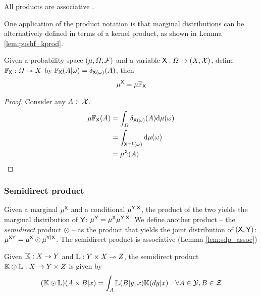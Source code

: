 All products are associative \citep[Chapter 1]{cinlar_probability_2011}.

One application of the product notation is that marginal distributions can be alternatively defined in terms of a kernel product, as shown in Lemma \ref{lem:pushf_kprod}.

\begin{lemma}\label{lem:pushf_kprod}
Given a probability space $(\mu,\Omega,\mathcal{F})$ and a variable $\mathsf{X}:\Omega\to (X,\mathcal{X})$, define $\mathbb{F}_{\mathsf{X}}:\Omega\rightarrowtriangle X$ by $\mathbb{F}_{\mathsf{X}}(A|\omega)=\delta_{\mathsf{X}(\omega)}(A)$, then
\begin{align}
	\mu^{\mathsf{X}} = \mu\mathbb{F}_{\mathsf{X}}
\end{align}
\end{lemma}

\begin{proof}
Consider any $A\in \mathcal{X}$.
\begin{align}
	\mu \mathbb{F}_{\mathsf{X}}(A) &= \int_\Omega \delta_{\mathsf{X}(\omega)}(A) \mathrm{d}\mu(\omega)\\
	&= \int_{\mathsf{X}^{-1}(\omega)} \mathrm{d}\mu(\omega)\\
	&= \mu^{\mathsf{X}}(A)
\end{align}
\end{proof}

\subsubsection{Semidirect product}

Given a marginal $\mu^{\mathsf{X}}$ and a conditional $\mu^{\mathsf{Y}|\mathsf{X}}$, the product of the two yields the marginal distribution of $\mathsf{Y}$: $\mu^{\mathsf{Y}}=\mu^{\mathsf{X}}\mu^{\mathsf{Y}|\mathsf{X}}$. We define another product -- the \emph{semidirect} product $\odot$ -- as the product that yields the joint distribution of $(\mathsf{X},\mathsf{Y})$: $\mu^{\mathsf{XY}}=\mu^{\mathsf{X}}\odot\mu^{\mathsf{Y}|\mathsf{X}}$. The semidirect product is associative (Lemma \ref{lem:sdp_assoc})

\begin{definition}\label{def:copyproduct}
Given $\mathbb{K}:X\rightarrowtriangle Y$ and $\mathbb{L}:Y\times X\rightarrowtriangle Z$, the semidirect product $\mathbb{K}\odot\mathbb{L}:X\to Y\times Z$ is given by
\begin{align}
    (\mathbb{K}\odot\mathbb{L})(A\times B|x) &= \int_A \mathbb{L}(B|y,x)\mathbb{K}(dy|x)&\forall A\in \mathcal{Y},B\in\mathcal{Z}
\end{align}
\end{definition}


